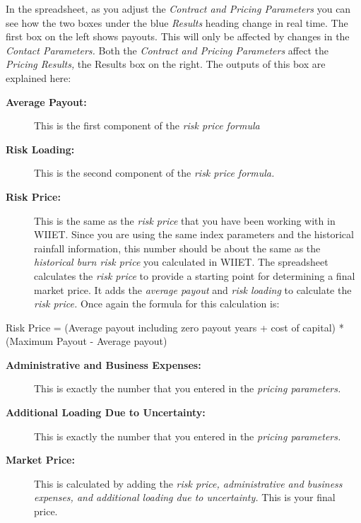 \documentclass[letterpaper,10pt,english]{sphinxmanual}
\begin{document}
In the spreadsheet, as you adjust the \emph{Contract and Pricing Parameters} you can see how the two boxes under the blue \emph{Results} heading change in real time. The first box on the left shows payouts. This will only be affected by changes in the \emph{Contact Parameters.} Both the \emph{Contract and Pricing Parameters} affect the \emph{Pricing Results,} the Results box on the right. The outputs of this box are explained here:
\begin{description}
\item[{\textbf{Average Payout:}}] \leavevmode
This is the first component of the \emph{risk price formula}

\item[{\textbf{Risk Loading:}}] \leavevmode
This is the second component of the \emph{risk price formula.}

\item[{\textbf{Risk Price:}}] \leavevmode
This is the same as the \emph{risk price} that you have been working with in WIIET. Since you are using the same index parameters and the historical rainfall information, this number should be about the same as the \emph{historical burn risk price} you calculated in WIIET. The spreadsheet calculates the \emph{risk price} to provide a starting point for determining a final market price. It adds the \emph{average payout} and \emph{risk loading} to calculate the \emph{risk price.} Once again the formula for this calculation is:

\end{description}

Risk Price = (Average payout including zero payout years + cost of capital) * (Maximum Payout - Average payout)
\begin{description}
\item[{\textbf{Administrative and Business Expenses:}}] \leavevmode
This is exactly the number that you entered in the \emph{pricing parameters.}

\item[{\textbf{Additional Loading Due to Uncertainty:}}] \leavevmode
This is exactly the number that you entered in the \emph{pricing parameters.}

\item[{\textbf{Market Price:}}] \leavevmode
This is calculated by adding the \emph{risk price, administrative and business expenses, and additional loading due to uncertainty.} This is your final price.

\end{description}
\end{document}
